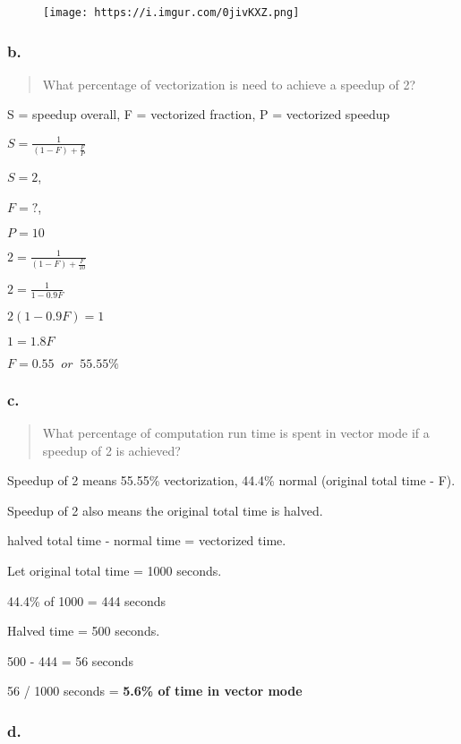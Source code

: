 \documentclass[]{article}
\begin{document}
\begin{figure}
\centering
\texttt{[image: https://i.imgur.com/0jivKXZ.png]}
\caption{}
\end{figure}

\subsubsection{b.}\label{header-n5112}

\begin{quote}
What percentage of vectorization is need to achieve a speedup of 2?
\end{quote}

S = speedup overall, F = vectorized fraction, P = vectorized speedup

\(S = \frac{1}{(1-F) +\frac{F}{P}}\)

\(S = 2\),

\(F = ?\),

\(P = 10\)

\(2 = \frac{1}{(1-F) + \frac{F}{10}}\)

\(2 = \frac{1}{1-0.9F}\)

\(2(1-0.9F) = 1\)

\(1 = 1.8F\)

\(F = 0.55 \;\; or \;\;55.55\%\)

\subsubsection{c.}\label{header-n5136}

\begin{quote}
What percentage of computation run time is spent in vector mode if a
speedup of 2 is achieved?
\end{quote}

Speedup of 2 means 55.55\% vectorization, 44.4\% normal (original total
time - F).

Speedup of 2 also means the original total time is halved.

halved total time - normal time = vectorized time.

Let original total time = 1000 seconds.

44.4\% of 1000 = 444 seconds

Halved time = 500 seconds.

500 - 444 = 56 seconds

56 / 1000 seconds = \textbf{5.6\% of time in vector mode}

\subsubsection{d.}\label{header-n5156}
\end{document}
